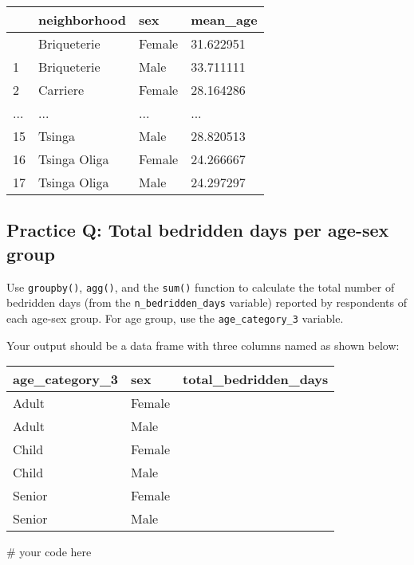 \documentclass[
  letterpaper,
  DIV=11,
  numbers=noendperiod]{scrreprt}
\newenvironment{Shaded}{\begin{snugshade}}{\end{snugshade}}
\newcommand{\CommentTok}[1]{\textcolor[rgb]{0.37,0.37,0.37}{#1}}
\begin{document}
\begin{longtable}[]{@{}llll@{}}
\toprule\noalign{}
& neighborhood & sex & mean\_age \\
\midrule\noalign{}
\endhead
\bottomrule\noalign{}
\endlastfoot
0 & Briqueterie & Female & 31.622951 \\
1 & Briqueterie & Male & 33.711111 \\
2 & Carriere & Female & 28.164286 \\
... & ... & ... & ... \\
15 & Tsinga & Male & 28.820513 \\
16 & Tsinga Oliga & Female & 24.266667 \\
17 & Tsinga Oliga & Male & 24.297297 \\
\end{longtable}

\begin{tcolorbox}[enhanced jigsaw, colframe=quarto-callout-tip-color-frame, opacityback=0, titlerule=0mm, bottomrule=.15mm, breakable, leftrule=.75mm, colbacktitle=quarto-callout-tip-color!10!white, title=\textcolor{quarto-callout-tip-color}{\faLightbulb}\hspace{0.5em}{Practice}, rightrule=.15mm, coltitle=black, opacitybacktitle=0.6, colback=white, left=2mm, arc=.35mm, toptitle=1mm, bottomtitle=1mm, toprule=.15mm]

\subsection{Practice Q: Total bedridden days per age-sex
group}\label{practice-q-total-bedridden-days-per-age-sex-group}

Use \texttt{groupby()}, \texttt{agg()}, and the \texttt{sum()} function
to calculate the total number of bedridden days (from the
\texttt{n\_bedridden\_days} variable) reported by respondents of each
age-sex group. For age group, use the \texttt{age\_category\_3}
variable.

Your output should be a data frame with three columns named as shown
below:

\begin{longtable}[]{@{}lll@{}}
\toprule\noalign{}
age\_category\_3 & sex & total\_bedridden\_days \\
\midrule\noalign{}
\endhead
\bottomrule\noalign{}
\endlastfoot
Adult & Female & \\
Adult & Male & \\
Child & Female & \\
Child & Male & \\
Senior & Female & \\
Senior & Male & \\
\end{longtable}

\begin{Shaded}
\begin{Highlighting}[]
\CommentTok{\# your code here}
\end{Highlighting}
\end{Shaded}

\end{tcolorbox}
\end{document}
